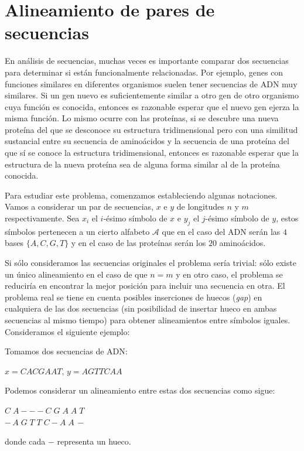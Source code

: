 \section{Alineamiento de pares de secuencias}
En análisis de secuencias, muchas veces es importante comparar dos secuencias para determinar si están funcionalmente relacionadas. Por ejemplo, genes con funciones similares en diferentes organismos suelen tener secuencias de ADN muy similares. Si un gen nuevo es suficientemente similar a otro gen de otro organismo cuya función es conocida, entonces es razonable esperar que el nuevo gen ejerza la misma función. Lo mismo ocurre con las proteínas, si se descubre una nueva proteína del que se desconoce su estructura tridimensional pero con una similitud sustancial entre su secuencia de aminoácidos y la secuencia de una proteína del que sí se conoce la estructura tridimensional, entonces es razonable esperar que la estructura de la nueva proteína sea de alguna forma similar al de la proteína conocida.

Para estudiar este problema, comenzamos estableciendo algunas notaciones. Vamos a considerar un par de secuencias, $x$ e $y$ de longitudes $n$ y $m$ respectivamente. Sea $x_i$ el $i$-ésimo símbolo de $x$ e $y_j$ el $j$-ésimo símbolo de $y$, estos símbolos pertenecen a un cierto alfabeto $\mathcal{A}$ que en el caso del ADN serán las $4$ bases $\{A,C,G,T\}$ y en el caso de las proteínas serán los $20$ aminoácidos.

Si sólo consideramos las secuencias originales el problema sería trivial: sólo existe un único alineamiento en el caso de que $n=m$ y en otro caso, el problema se reduciría en encontrar la mejor posición para incluir una secuencia en otra. El problema real se tiene en cuenta posibles inserciones de huecos (\textit{gap}) en cualquiera de las dos secuencias (sin posibilidad de insertar hueco en ambas secuencias al mismo tiempo) para obtener alineamientos entre símbolos iguales. Consideramos el siguiente ejemplo:

\begin{exampleth}
    Tomamos dos secuencias de ADN:
    \begin{center}
        $x=CACGAAT$, $y=AGTTCAA$
    \end{center}
    Podemos considerar un alineamiento entre estas dos secuencias como sigue:
    \begin{center}
        $C\; A - - - C\; G\; A\; A\; T$ \\
        $-\, A\; G\; T\; T\; C - A\; A\, -$
    \end{center}
    donde cada $-$ representa un hueco.
\end{exampleth}

